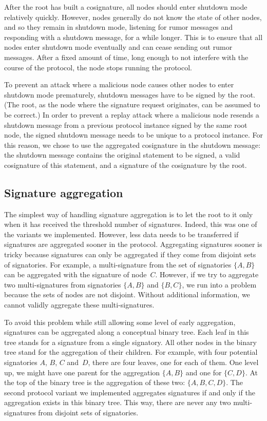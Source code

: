 After the root has built a cosignature, all nodes should enter shutdown mode relatively quickly.
However, nodes generally do not know the state of other nodes, and so they remain in shutdown mode, listening for rumor messages and responding with a shutdown message, for a while longer.
This is to ensure that all nodes enter shutdown mode eventually and can cease sending out rumor messages.
After a fixed amount of time, long enough to not interfere with the course of the protocol, the node stops running the protocol.

To prevent an attack where a malicious node causes other nodes to enter shutdown mode prematurely, shutdown messages have to be signed by the root.
(The root, as the node where the signature request originates, can be assumed to be correct.)
In order to prevent a replay attack where a malicious node resends a shutdown message from a previous protocol instance signed by the same root node, the signed shutdown message needs to be unique to a protocol instance.
For this reason, we chose to use the aggregated cosignature in the shutdown message: the shutdown message contains the original statement to be signed, a valid cosignature of this statement, and a signature of the cosignature by the root.


\subsection{Signature aggregation}
\label{aggregation}

The simplest way of handling signature aggregation is to let the root to it only when it has received the threshold number of signatures.
Indeed, this was one of the variants we implemented.
However, less data needs to be transferred if signatures are aggregated sooner in the protocol.
Aggregating signatures sooner is tricky because signatures can only be aggregated if they come from disjoint sets of signatories.
For example, a multi-signature from the set of signatories $\{A, B\}$ can be aggregated with the signature of node~$C$.
However, if we try to aggregate two multi-signatures from signatories $\{A, B\}$ and $\{B, C\}$, we run into a problem because the sets of nodes are not disjoint.
Without additional information, we cannot validly aggregate these multi-signatures.

To avoid this problem while still allowing some level of early aggregation, signatures can be aggregated along a conceptual binary tree.
Each leaf in this tree stands for a signature from a single signatory.
All other nodes in the binary tree stand for the aggregation of their children.
For example, with four potential signatories $A$, $B$, $C$ and~$D$, there are four leaves, one for each of them.
One level up, we might have one parent for the aggregation $\{A, B\}$ and one for $\{C, D\}$.
At the top of the binary tree is the aggregation of these two: $\{A, B, C, D\}$.
The second protocol variant we implemented aggregates signatures if and only if the aggregation exists in this binary tree.
This way, there are never any two multi-signatures from disjoint sets of signatories.


